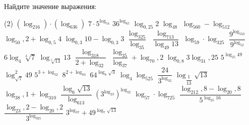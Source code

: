 \begin{class}[number=3]
	\begin{listofex}
		\item {}
		\item Найдите значение выражения:
			\begin{tasks}(2)
				\task \( (\log_216)\cdot(\log_636) \)
				\task \( 7\cdot5^{\log_54} \)
				\task \( 36^{\log_65} \)
				\task \( \log_{0,25}2 \)
				\task \( \log_48 \)
				\task \( \log_560-\log_512 \)
				\task \( \log_50,2+\log_{0,5}4 \)
				\task \( \log_{0,3}10-\log_{0,3}3 \)
				\task \( \dfrac{\log_325}{\log_35} \)
				\task \( \dfrac{\log_713}{\log_{49}13} \)
				\task \( \log_59\cdot\log_325 \)
				\task \( \dfrac{9^{\log_550}}{9^{\log_52}} \)
				\task \( 6\log_4\sqrt[3]{7} \)
				\task \( \log_{\sqrt[6]{13}}13 \)
				\task \( \dfrac{\log_318}{2+\log_32} \)
				\task \( \dfrac{\log_35}{\log_37}+\log_70,2 \)
				\task \( \log_{0,8}3\log_31,25 \)
				\task \( 5^{\log_{25}49} \)
				\task \( \log^2_{\sqrt{7}}49 \)
				\task \( 5^{3+\log_52} \)
				\task \( 8^{2+\log_83} \)
				\task \( 64^{\log_8\sqrt{3}} \)
				\task \( \log_4\log_525 \)
				\task \( \dfrac{24}{3^{\log_32}} \)
				\task \( \log_{\dfrac{1}{13}}\sqrt{13} \)
				\task \( \log_38,1+\log_310 \)
				\task \( \dfrac{\log_6\sqrt{13}}{\log_613} \)
				\task \( \left( 3^{\log_23} \right)^{\log_32}\)
				\task \( \log_57\cdot\log_725 \)
				\task \( \dfrac{\log_212,8-\log_20,8}{5^{\log_{25}16}} \)
				\task \( \dfrac{\log_23,2-\log_20,2}{3^{\log_925}} \)
				\task \( 3^{\log_37}+49^{\log_7{\sqrt{13}}} \)
			\end{tasks}	
	\end{listofex}
\end{class}
%
%
%
%
%
%
